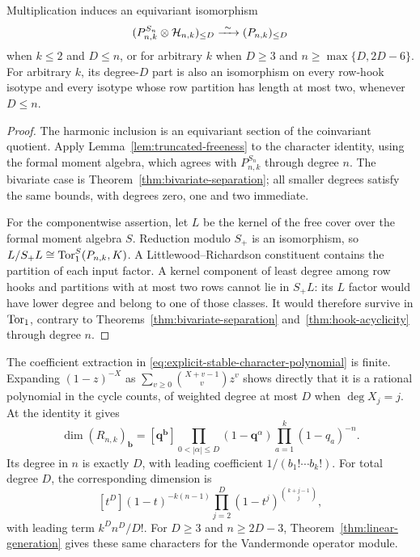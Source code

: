 \begin{corollary}
\label{cor:uniform-separation}
Multiplication induces an equivariant isomorphism
\[
 (P_{n,k}^{S_n}\otimes\mathcal H_{n,k})_{\le D}
                         \xrightarrow{\ \sim\ }(P_{n,k})_{\le D}
\]
when $k\le2$ and $D\le n$, or for arbitrary $k$ when
$D\ge3$ and $n\ge\max\{D,2D-6\}$.
For arbitrary $k$, its degree-$D$ part is also an isomorphism on
every row-hook isotype and every isotype whose row partition has
length at most two, whenever $D\le n$.
\end{corollary}
\begin{proof}
The harmonic inclusion is an equivariant section of the coinvariant
quotient. Apply Lemma~\ref{lem:truncated-freeness} to the character
identity, using the formal moment algebra, which agrees with
$P_{n,k}^{S_n}$ through degree $n$. The bivariate case is
Theorem~\ref{thm:bivariate-separation}; all smaller degrees satisfy
the same bounds, with degrees zero, one and two immediate.

For the componentwise assertion, let $L$ be the kernel of the free
cover over the formal moment algebra $S$. Reduction modulo $S_+$
is an isomorphism, so $L/S_+L\cong\operatorname{Tor}_1^S(P_{n,k},K)$.
A Littlewood--Richardson constituent contains the partition of
each input factor. A kernel component of least degree among row
hooks and partitions with at most two rows cannot lie in $S_+L$:
its $L$ factor would have lower degree and belong to one of those classes.
It would therefore survive in $\operatorname{Tor}_1$, contrary to
Theorems~\ref{thm:bivariate-separation} and~\ref{thm:hook-acyclicity}
through degree $n$.
\end{proof}

The coefficient extraction in
\eqref{eq:explicit-stable-character-polynomial} is finite.
Expanding $(1-z)^{-X}$ as
$\sum_{v\ge0}\binom{X+v-1}{v}z^v$ shows directly that
it is a rational polynomial in the cycle counts, of weighted
degree at most $D$ when $\deg X_j=j$. At the identity it gives
\begin{equation}\label{eq:explicit-stable-dimension-polynomial}
 \dim(R_{n,k})_{\mathbf b}
 = [\mathbf q^{\mathbf b}]
    \prod_{0<|\alpha|\le D}(1-\mathbf q^\alpha)
    \prod_{a=1}^k(1-q_a)^{-n}.
\end{equation}
Its degree in $n$ is exactly $D$, with leading coefficient
$1/(b_1!\cdots b_k!)$.
For total degree $D$, the corresponding dimension is
\[
 [t^D](1-t)^{-k(n-1)}
       \prod_{j=2}^{D}(1-t^j)^{\binom{k+j-1}{j}},
\]
with leading term $k^Dn^D/D!$.
For $D\ge3$ and $n\ge2D-3$, Theorem~\ref{thm:linear-generation}
gives these same characters for the Vandermonde operator module.

